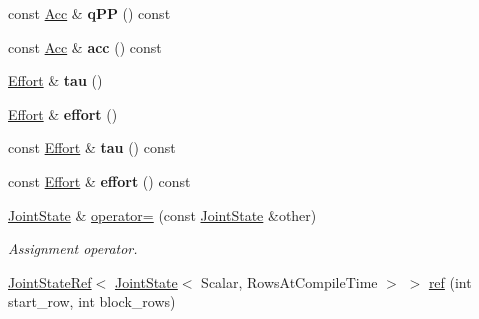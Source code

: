 \begin{DoxyCompactItemize}
\item 
const \hyperlink{classow__core_1_1JointAcceleration}{Acc} \& {\bfseries q\+PP} () const \hypertarget{classow__core_1_1JointState_a2953bf08dd06f65b9dcad7a80b330555}{}\label{classow__core_1_1JointState_a2953bf08dd06f65b9dcad7a80b330555}

\item 
const \hyperlink{classow__core_1_1JointAcceleration}{Acc} \& {\bfseries acc} () const \hypertarget{classow__core_1_1JointState_a7a30098396ee052aabc37d9bc8dcf1b2}{}\label{classow__core_1_1JointState_a7a30098396ee052aabc37d9bc8dcf1b2}

\item 
\hyperlink{classow__core_1_1JointEffort}{Effort} \& {\bfseries tau} ()\hypertarget{classow__core_1_1JointState_a750c4c648e2c105bb28a1e2392a81267}{}\label{classow__core_1_1JointState_a750c4c648e2c105bb28a1e2392a81267}

\item 
\hyperlink{classow__core_1_1JointEffort}{Effort} \& {\bfseries effort} ()\hypertarget{classow__core_1_1JointState_a0d44105383cf528751346c7d0142047c}{}\label{classow__core_1_1JointState_a0d44105383cf528751346c7d0142047c}

\item 
const \hyperlink{classow__core_1_1JointEffort}{Effort} \& {\bfseries tau} () const \hypertarget{classow__core_1_1JointState_a94cefd354008e2d4ab229268b3dc6379}{}\label{classow__core_1_1JointState_a94cefd354008e2d4ab229268b3dc6379}

\item 
const \hyperlink{classow__core_1_1JointEffort}{Effort} \& {\bfseries effort} () const \hypertarget{classow__core_1_1JointState_a67fb11ae718dc552972d0d60f99ff2ea}{}\label{classow__core_1_1JointState_a67fb11ae718dc552972d0d60f99ff2ea}

\item 
\hyperlink{classow__core_1_1JointState}{Joint\+State} \& \hyperlink{classow__core_1_1JointState_a9c35a1e381caae2425df61c2466238b7}{operator=} (const \hyperlink{classow__core_1_1JointState}{Joint\+State} \&other)\hypertarget{classow__core_1_1JointState_a9c35a1e381caae2425df61c2466238b7}{}\label{classow__core_1_1JointState_a9c35a1e381caae2425df61c2466238b7}

\begin{DoxyCompactList}\small\item\em Assignment operator. \end{DoxyCompactList}\item 
\hyperlink{classow__core_1_1JointStateRef}{Joint\+State\+Ref}$<$ \hyperlink{classow__core_1_1JointState}{Joint\+State}$<$ Scalar, Rows\+At\+Compile\+Time $>$ $>$ \hyperlink{classow__core_1_1JointState_a0ad96a086906bb99da3ac0727bd5fe2c}{ref} (int start\+\_\+row, int block\+\_\+rows)\hypertarget{classow__core_1_1JointState_a0ad96a086906bb99da3ac0727bd5fe2c}{}\label{classow__core_1_1JointState_a0ad96a086906bb99da3ac0727bd5fe2c}


\end{DoxyCompactItemize}
